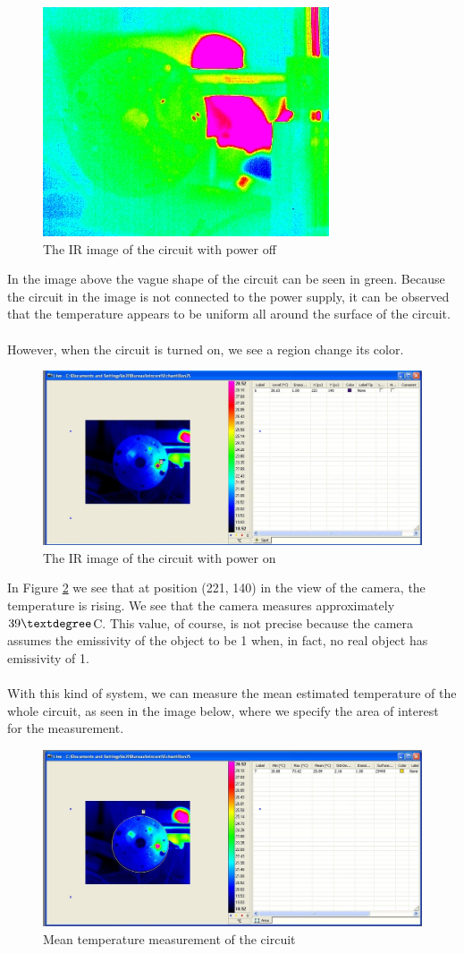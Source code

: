 \documentclass[english]{article}
\begin{document}
\begin{figure}[H]
	\centering
	\includegraphics[width=0.3\linewidth]{Pictures/circuit_cold001.JPG}
	\caption{The IR image of the circuit with power off}
	\label{fig:one}
\end{figure}
In the image above the vague shape of the circuit can be seen in green. 
Because the circuit in the image is not connected to the power supply, it can be observed that the temperature appears to be uniform all around the surface of the circuit.\\
\\
However, when the circuit is turned on, we see a region change its color.
\begin{figure}[H]
	\centering
	\includegraphics[width=1\linewidth]{Pictures/position1.JPG}
	\caption{The IR image of the circuit with power on}
	\label{fig:two}
\end{figure}
In Figure \ref{fig:two} we see that at position (221, 140) in the view of the camera, the temperature is rising.
We see that the camera measures approximately $39 \textdegree$C.
This value, of course, is not precise because the camera assumes the emissivity of the object to be 1 when, in fact, no real object has emissivity of 1.\\
\\
With this kind of system, we can measure the mean estimated temperature of the whole circuit, as seen in the image below, where we specify the area of interest for the measurement.
\begin{figure}[H]
	\centering
	\includegraphics[width=1\linewidth]{Pictures/max1.JPG}
	\caption{Mean temperature measurement of the circuit}
	\label{fig:three}
\end{figure}
\end{document}
